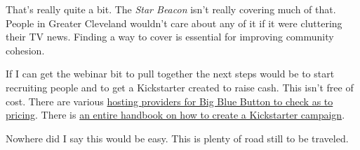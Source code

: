 That's really quite a bit. The \emph{Star Beacon} isn't really covering
much of that. People in Greater Cleveland wouldn't care about any of it
if it were cluttering their TV news. Finding a way to cover is essential
for improving community cohesion.

If I can get the webinar bit to pull together the next steps would be to
start recruiting people and to get a Kickstarter created to raise cash.
This isn't free of cost. There are various
\href{https://bigbluebutton.org/commercial-support/}{hosting providers
for Big Blue Button to check as to pricing}. There is
\href{https://www.kickstarter.com/help/handbook}{an entire handbook on
how to create a Kickstarter campaign}.

Nowhere did I say this would be easy. This is plenty of road still to be
traveled.
